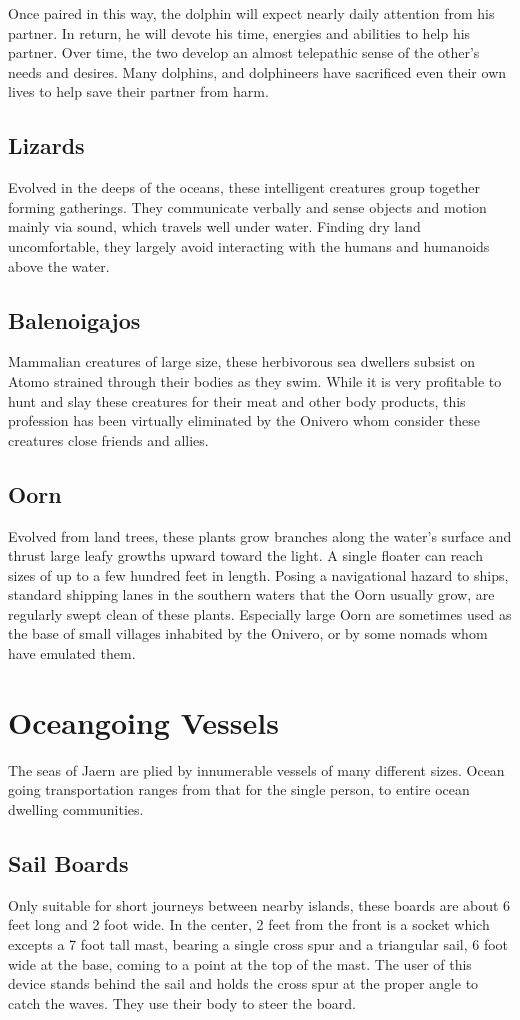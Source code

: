 \begin{multicols*}{2}
Once paired in this way, the dolphin will expect nearly daily attention from his partner. In return, he will devote his time, energies and abilities to help his partner. Over time, the two develop an almost telepathic sense of the other’s needs and desires. Many dolphins, and dolphineers have sacrificed even their own lives to help save their partner from harm.
\subsection{Lizards}
Evolved in the deeps of the oceans, these intelligent
creatures group together forming gatherings. They communicate verbally and sense objects and motion mainly via sound, which travels well under water. Finding dry land
uncomfortable, they largely avoid interacting with the humans and humanoids above the water.
\subsection{Balenoigajos}
Mammalian creatures of large size, these  herbivorous sea dwellers subsist on Atomo strained through their bodies as they swim. While it is very profitable to hunt
and slay these creatures for their meat and other body products, this profession has been virtually eliminated by the Onivero whom consider these creatures close friends and allies.
\subsection{Oorn}
Evolved from land trees, these plants grow branches along the water's surface and thrust large leafy growths upward toward the light. A single floater can reach
sizes of up to a few hundred feet in length. Posing a  navigational hazard to ships, standard shipping lanes in the southern waters that the Oorn usually grow, are regularly
swept clean of these plants. Especially large Oorn are sometimes used as the base of small villages inhabited by the Onivero, or by some nomads whom have emulated them.
\section{Oceangoing Vessels}
The seas of Jaern are plied by innumerable vessels of many different sizes. Ocean going transportation ranges from that for the single person, to entire ocean dwelling communities.
\subsection{Sail Boards}
Only suitable for short journeys between nearby islands, these boards are about 6 feet long and 2 foot wide. In the center, 2 feet from the front is a socket which excepts a 7
foot tall mast, bearing a single cross spur and a triangular sail, 6 foot wide at the base, coming to a point at the top of the mast. The user of this device stands behind the sail and holds the cross spur at the proper angle to catch the waves. They use their body to steer the board.


\end{multicols*}

